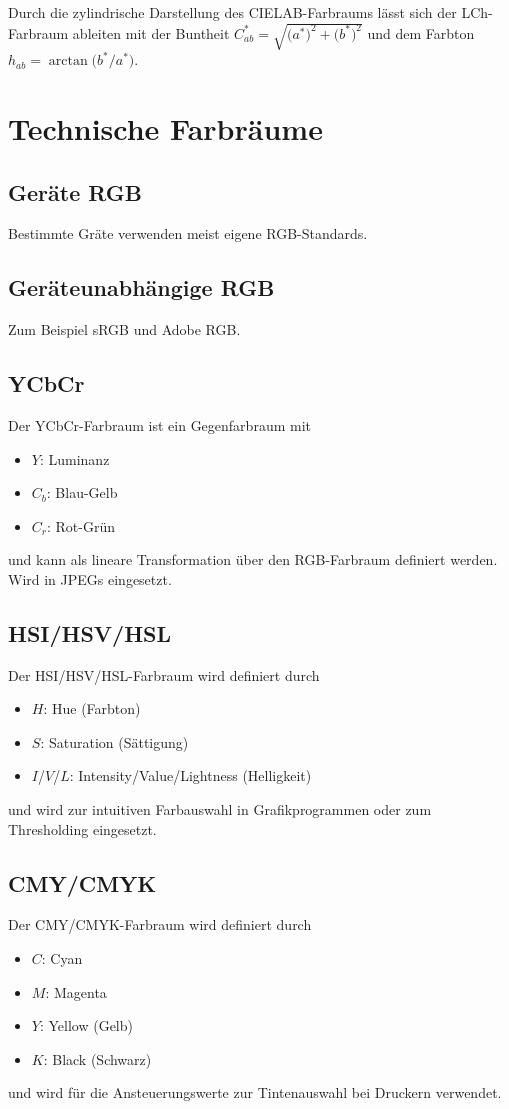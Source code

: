 		Durch die zylindrische Darstellung des CIELAB-Farbraums lässt sich der LCh-Farbraum ableiten mit der Buntheit \( C_{ab}^\ast = \sqrt{\big(a^\ast\big)^2 + \big(b^\ast\big)^2} \) und dem Farbton \( h_{ab} = \arctan\big( b^\ast / a^\ast \big) \).

	\section{Technische Farbräume}
		\subsection{Geräte RGB}
			Bestimmte Gräte verwenden meist eigene RGB-Standards.

		\subsection{Geräteunabhängige RGB}
			Zum Beispiel sRGB und Adobe RGB.

		\subsection{YCbCr}
			Der YCbCr-Farbraum ist ein Gegenfarbraum mit
			\begin{itemize}
				\item \(Y\): Luminanz
				\item \(C_b\): Blau-Gelb
				\item \(C_r\): Rot-Grün
			\end{itemize}
			und kann als lineare Transformation über den RGB-Farbraum definiert werden. Wird \bspw in JPEGs eingesetzt.

		\subsection{HSI/HSV/HSL}
			Der HSI/HSV/HSL-Farbraum wird definiert durch
			\begin{itemize}
				\item \(H\): Hue (Farbton)
				\item \(S\): Saturation (Sättigung)
				\item \(I\)/\(V\)/\(L\): Intensity/Value/Lightness (Helligkeit)
			\end{itemize}
			und wird \bspw zur intuitiven Farbauswahl in Grafikprogrammen oder zum Thresholding eingesetzt.

		\subsection{CMY/CMYK}
			Der CMY/CMYK-Farbraum wird definiert durch
			\begin{itemize}
				\item \(C\): Cyan
				\item \(M\): Magenta
				\item \(Y\): Yellow (Gelb)
				\item \(K\): Black (Schwarz)
			\end{itemize}
			und wird \bspw für die Ansteuerungswerte zur Tintenauswahl bei Druckern verwendet.

